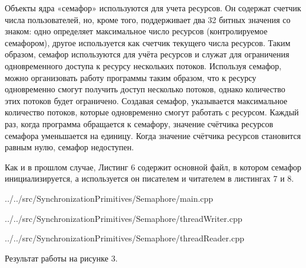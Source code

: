 \documentclass[a4paper, 12pt]{article}		%
\begin{document}
Объекты ядра «семафор» используются для учета ресурсов. Он содержат счетчик числа пользователей, но, кроме того, поддерживает два 32 битных значения со знаком: одно определяет максимальное число ресурсов (контролируемое семафором), другое используется как счетчик текущего числа ресурсов. Таким образом, семафор используются для учёта ресурсов и служат для ограничения одновременного доступа к ресурсу нескольких потоков. Используя семафор, можно организовать работу программы таким образом, что к ресурсу одновременно смогут получить доступ несколько потоков, однако количество этих потоков будет ограничено. Создавая семафор, указывается максимальное количество потоков, которые одновременно смогут работать с ресурсом. Каждый раз, когда программа обращается к семафору, значение счётчика ресурсов семафора уменьшается на единицу. Когда значение счётчика ресурсов становится равным нулю, семафор недоступен\cite{Ogins}.

Как и в прошлом случае, Листинг 6 содержит основной файл, в котором семафор инициализируется, а используется он писателем и читателем в листингах 7 и 8.


{../../src/SynchronizationPrimitives/Semaphore/main.cpp}
\newpage


{../../src/SynchronizationPrimitives/Semaphore/threadWriter.cpp}


{../../src/SynchronizationPrimitives/Semaphore/threadReader.cpp}

Результат работы на рисунке 3.
\end{document}
